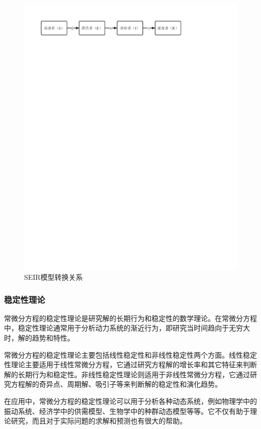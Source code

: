 \begin{figure}[htbp]
    \centering
    \includegraphics{image/SEIR}
    \caption{SEIR模型转换关系}
    \label{img:SEIR}
\end{figure} 

\subsubsection{稳定性理论}
常微分方程的稳定性理论是研究解的长期行为和稳定性的数学理论。在常微分方程中，稳定性理论通常用于分析动力系统的渐近行为，即研究当时间趋向于无穷大时，解的趋势和特性。

常微分方程的稳定性理论主要包括线性稳定性和非线性稳定性两个方面。线性稳定性理论主要适用于线性常微分方程，它通过研究方程解的增长率和其它特征来判断解的长期行为和稳定性。非线性稳定性理论则适用于非线性常微分方程，它通过研究方程解的奇异点、周期解、吸引子等来判断解的稳定性和演化趋势。

在应用中，常微分方程的稳定性理论可以用于分析各种动态系统，例如物理学中的振动系统、经济学中的供需模型、生物学中的种群动态模型等等。它不仅有助于理论研究，而且对于实际问题的求解和预测也有很大的帮助。

